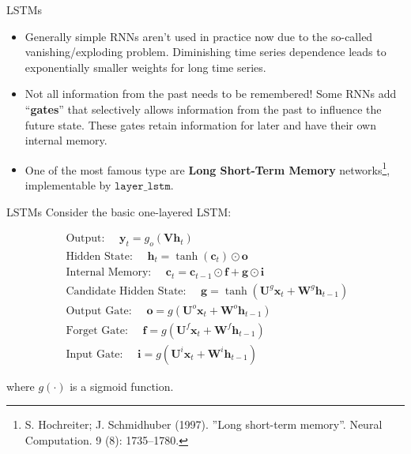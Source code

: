\documentclass{beamer}
\begin{document}
\begin{frame}{LSTMs}
\begin{itemize}
\item Generally simple RNNs aren't used in practice now due to the so-called vanishing/exploding problem. Diminishing time series dependence leads to exponentially smaller weights for long time series.
\item Not all information from the past needs to be remembered! Some RNNs add ``\textbf{gates}'' that selectively allows information from the past to influence the future state. These gates retain information for later and have their own internal memory.
\item One of the most famous type are \textbf{Long Short-Term Memory} networks\footnote{S. Hochreiter; J. Schmidhuber (1997). ''Long short-term memory''. Neural Computation. 9 (8): 1735–1780.}, implementable by $\texttt{layer\_lstm}$.
\end{itemize}

\end{frame}
\begin{frame}{LSTMs}
Consider the basic one-layered LSTM:

$$
\begin{gathered}
\text { Output: } \quad \mathbf{y}_{t}=g_{o}\left(\mathbf{V h}_{t}\right) \\
\text { Hidden State: } \quad \mathbf{h}_{t}=\tanh \left(\mathbf{c}_{t}\right) \odot \mathbf{o} \\
\text { Internal Memory: } \quad \mathbf{c}_{t}=\mathbf{c}_{t-1} \odot \mathbf{f}+\mathbf{g} \odot \mathbf{i} \\
\text { Candidate Hidden State: } \quad \mathbf{g}=\tanh \left(\mathbf{U}^{g} \mathbf{x}_{t}+\mathbf{W}^{g} \mathbf{h}_{t-1}\right) \\
\text { Output Gate: } \quad \mathbf{o}=g\left(\mathbf{U}^{o} \mathbf{x}_{t}+\mathbf{W}^{o} \mathbf{h}_{t-1}\right) \\
\text { Forget Gate: } \quad \mathbf{f}=g\left(\mathbf{U}^{f} \mathbf{x}_{t}+\mathbf{W}^{f} \mathbf{h}_{t-1}\right) \\
\text { Input Gate: } \quad \mathbf{i}=g\left(\mathbf{U}^{i} \mathbf{x}_{t}+\mathbf{W}^{i} \mathbf{h}_{t-1}\right)
\end{gathered}
$$

where $g(\cdot)$ is a sigmoid function.
\end{frame}
\end{document}
